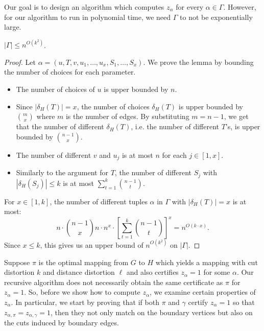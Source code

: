 Our goal is to design an algorithm which computes $z_{\alpha}$ for
every $\alpha \in \Gamma$. However, for our algorithm to run in
polynomial time, we need $\Gamma$ to not be exponentially large.

\begin{lemma}  $|\Gamma| \leq n^{O(k^2)}$.
\end{lemma}
\begin{proof}
  Let $\alpha=(u,T,v,u_1,\dots,u_x,S_1,\dots,S_x)$. We prove the lemma
  by bounding the number of choices for each parameter.
  \begin{itemize}
  \item The number of choices of $u$ is upper bounded by $n$.
  \item Since $|\delta_H(T)|=x$, the number of choices $\delta_H(T)$
    is upper bounded by ${m \choose x}$ where $m$ is the number of
    edges. By substituting $m = n-1$, we get that the number of
    different $\delta_H(T)$, i.e. the number of different $T$'s, is
    upper bounded by ${n-1 \choose x}$.
  \item The number of different $v$ and $u_j$ is at most $n$ for each
    $j \in [1,x]$.
  \item Similarly to the argument for $T$, the number of different
    $S_j$ with $|\delta_H(S_j)| \leq k$ is at most
    $\sum_{t=1}^k {n-1 \choose t}$.
  \end{itemize}
  For $x \in [1,k]$, the number of different tuples $\alpha$ in
  $\Gamma$ with $|\delta_H(T)|=x$ is at most:
  \begin{equation*}
    n\cdot {n-1 \choose x} n \cdot n^x \cdot \left[\sum_{t=1}^k {n-1
      \choose t}\right]^x 
    = n^{O(k\cdot x)}.
  \end{equation*}
  Since $x \le k$, this gives us an upper bound of $n^{O(k^2)}$ on
  $|\Gamma|$.
\end{proof}


Suppose $\pi$ is the optimal mapping from $G$ to $H$ which yields a
mapping with cut distortion $k$ and distance distortion $\ell$ and
also certifies $z_{\alpha} = 1$ for some $\alpha$. Our recursive
algorithm does not necessarily obtain the same certificate as $\pi$
for $z_{\alpha} = 1$. So, before we show how to compute $z_{\alpha}$,
we examine certain properties of $z_{\alpha}$. In particular, we start
by proving that if both $\pi$ and $\gamma$ certify $z_{\alpha} = 1$ so
that $z_{\alpha,\pi}=z_{\alpha,\gamma} = 1$, then they not only match
on the boundary vertices but also on the cuts induced by boundary
edges.

